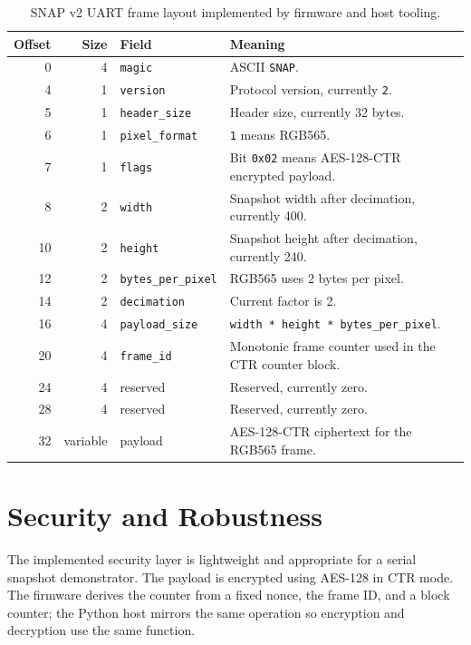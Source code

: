 \documentclass[11pt,a4paper]{article}
\begin{document}
\begin{table}[H]
\centering
\begin{tabularx}{0.98\textwidth}{@{}r r l X@{}}
\toprule
\textbf{Offset} & \textbf{Size} & \textbf{Field} & \textbf{Meaning} \\
\midrule
0 & 4 & \texttt{magic} & ASCII \texttt{SNAP}. \\
4 & 1 & \texttt{version} & Protocol version, currently \texttt{2}. \\
5 & 1 & \texttt{header\_size} & Header size, currently 32 bytes. \\
6 & 1 & \texttt{pixel\_format} & \texttt{1} means RGB565. \\
7 & 1 & \texttt{flags} & Bit \texttt{0x02} means AES-128-CTR encrypted payload. \\
8 & 2 & \texttt{width} & Snapshot width after decimation, currently 400. \\
10 & 2 & \texttt{height} & Snapshot height after decimation, currently 240. \\
12 & 2 & \texttt{bytes\_per\_pixel} & RGB565 uses 2 bytes per pixel. \\
14 & 2 & \texttt{decimation} & Current factor is 2. \\
16 & 4 & \texttt{payload\_size} & \texttt{width * height * bytes\_per\_pixel}. \\
20 & 4 & \texttt{frame\_id} & Monotonic frame counter used in the CTR counter block. \\
24 & 4 & reserved & Reserved, currently zero. \\
28 & 4 & reserved & Reserved, currently zero. \\
32 & variable & payload & AES-128-CTR ciphertext for the RGB565 frame. \\
\bottomrule
\end{tabularx}
\caption{SNAP v2 UART frame layout implemented by firmware and host tooling.}
\label{tab:protocol}
\end{table}

\section{Security and Robustness}
The implemented security layer is lightweight and appropriate for a serial
snapshot demonstrator. The payload is encrypted using AES-128 in CTR mode. The
firmware derives the counter from a fixed nonce, the frame ID, and a block
counter; the Python host mirrors the same operation so encryption and decryption
use the same function.
\end{document}
